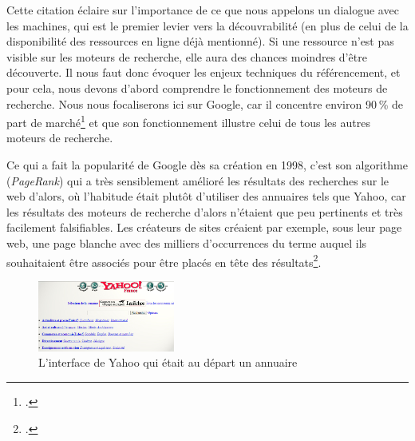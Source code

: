 Cette citation éclaire sur l’importance de ce que nous appelons un dialogue avec les machines, qui est le premier levier vers la découvrabilité (en plus de celui de la disponibilité des ressources en ligne déjà mentionné). Si une ressource n’est pas visible sur les moteurs de recherche, elle aura des chances moindres d’être découverte. Il nous faut donc évoquer les enjeux techniques du référencement, et pour cela, nous devons d’abord comprendre le fonctionnement des moteurs de recherche. Nous nous focaliserons ici sur Google, car il concentre environ 90 \% de part de marché\footcite{zotero-245} et que son fonctionnement illustre celui de tous les autres moteurs de recherche. 

Ce qui a fait la popularité de Google dès sa création en 1998, c’est son algorithme (\textit{PageRank}) qui a très sensiblement amélioré les résultats des recherches sur le web d’alors, où l’habitude était plutôt d’utiliser des annuaires tels que Yahoo, car les résultats des moteurs de recherche d’alors n’étaient que peu pertinents et très facilement falsifiables. Les créateurs de sites créaient par exemple, sous leur page web, une page blanche avec des milliers d’occurrences du terme auquel ils souhaitaient être associés pour être placés en tête des résultats\footcite[§ 4]{cardon2013}.


\begin{figure}[h!]
	\centering
	\includegraphics[width=0.4\textwidth]{images/image2.jpg}
	\caption{L'interface de Yahoo qui était au départ un annuaire }
	\label{fig:image2}
\end{figure}


